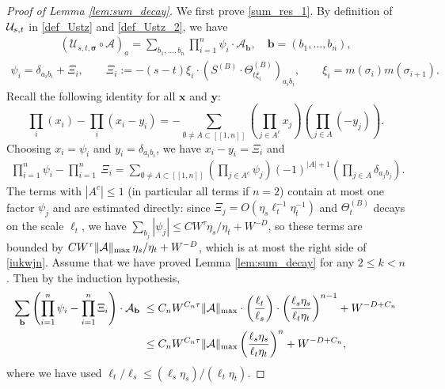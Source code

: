 \documentclass[10pt,reqno]{article}
\theoremstyle{plain} %
\theoremstyle{remark}
\numberwithin{equation}{section}
\begin{document}
\begin{proof}[Proof of Lemma \ref{lem:sum_decay}]
We first prove \eqref{sum_res_1}.  By definition of ${\cal U}_{s, t}$ in \eqref{def_Ustz} and \eqref{def_Ustz_2}, we have 
\begin{align}
      \left(\mathcal{U}_{s, t, \boldsymbol{\sigma}} \circ \mathcal{A}\right)_a=\sum_{b_1, \ldots, b_n} \prod_{i=1}^n\psi_i  \cdot \mathcal{A}_{\boldsymbol{b}}, \quad \boldsymbol{b}=\left(b_1, \ldots, b_n\right),
\end{align}
\begin{align}\label{def_psixi}
     \psi_i=\delta_{a_ib_i}+\Xi_i,  \quad \quad 
\Xi_i:=-(s-t)\xi_i \cdot \left(S^{(B)}\cdot \Theta^{(B)}_{t \xi_i}\right)_{a_ib_i},\quad\quad \xi_i=m(\sigma_i)m(\sigma_{i+1}).
 \end{align} 
Recall the following identity for all $\textbf{x}$ and $\textbf{y}$:
$$
\prod_i(x_i)-\prod_i (x_i-y_i) 
=-\sum_{\emptyset\ne A\subset[[1,n]]}\left(\prod_{j\in A^c}x_j \right)
\left(\prod_{j\in A }(-y_j)\right).
$$
Choosing   $x_i=\psi_i$ and $y_i=\delta_{a_ib_i}$, we have  $x_i-y_i=\Xi_i$ and  
 \begin{align}
    \prod_{i=1}^n  \psi_i 
    -\prod_{i=1}^n \ \Xi_i = \sum_{\emptyset\ne A\subset[[1,n]]}\left(\prod_{j\in A^c}\psi_j \right)
(-1)^{|A|+1}\left(\prod_{j\in A }\delta_{a_jb_j} \right).
\end{align}
The terms with $|A^c|\le 1$ (in particular all terms if $n=2$) contain at most one factor $\psi_j$ and are estimated directly: since $\Xi_j=O(\eta_s\ell_t^{-1}\eta_t^{-1})$ and $\Theta^{(B)}_t$ decays on the scale $\ell_t$, we have $\sum_{b_j}|\psi_j|\le CW^{\tau}\eta_s/\eta_t+W^{-D}$, so these terms are bounded by $CW^{\tau}\|{\cal A}\|_{\max}\,\eta_s/\eta_t+W^{-D}$, which is at most the right side of \eqref{iukwjn}. Assume that we have proved Lemma \ref{lem:sum_decay} for any $2\le k<n$.  Then by the induction hypothesis, 
\begin{align}\label{iukwjn}
\sum_{\textbf{b}} \left(\prod_{i=1}^n  \psi_i- \prod_{i=1}^n  \Xi_i\right) \cdot 
{\cal A}_{\textbf{b}} 
 \; \le \; & C_n W^{C_n\tau}\|{\cal A}\|_{\max}\cdot \left(\frac{\ell_t}{\ell_s}\right) 
    \cdot \left(\frac{\ell_s\eta_s}{\ell_t\eta_t}\right)^{n-1 } +W^{-D+C_n}
    \\\nonumber
  \; \le \; &  C_n W^{C_n\tau}\|{\cal A}\|_{\max}\left(\frac{\ell_s\eta_s}{\ell_t\eta_t}\right)^{n  }    +W^{-D+C_n} ,  
\end{align}
where we have used $\ell_t/\ell_s\le \left( \ell_s\eta_s\right)/\left(\ell_t\eta_t\right)$. 


\end{proof}
\end{document}
